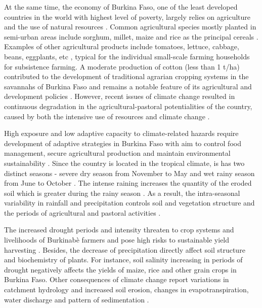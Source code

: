 \documentclass[knowledge,article,submit,pdftex,moreauthors]{Definitions/mdpi}
\begin{document}
At the same time, the economy of Burkina Faso, one of the least developed countries in the world with highest level of poverty, largely relies on agriculture and the use of natural resources \cite{1525946}. Common agricultural species mostly planted in semi-urban areas include sorghum, millet, maize and rice as the principal cereals \cite{SEOGO2023106475,ARUMUGAM2023126655}. Examples of other agricultural products include tomatoes, lettuce, cabbage, beans, eggplants, etc \cite{Ouedraogo2019}, typical for the individual small-scale farming households for subsistence farming. A moderate production of cotton (less than 1 t/ha) contributed to the development of traditional agrarian cropping systems in the savannahs of Burkina Faso and remains a notable feature of its agricultural and development policies \cite{Soumare}. However, recent issues of climate change resulted in continuous degradation in the agricultural-pastoral potentialities of the country, caused by both the intensive use of resources \cite{Vall} and climate change \cite{DIMOBE2022126299}. 

High exposure and low adaptive capacity to climate-related hazards require development of adaptive strategies in Burkina Faso with aim to control food management, secure agricultural production and maintain environmental sustainability \cite{BUNCLARK2018243,daniel2013farming}. Since the country is located in the tropical climate, is has two distinct seasons - severe dry season from November to May and wet rainy season from June to October \cite{OFORISARPONG1987179}. The intense raining increases the quantity of the eroded soil which is greater during the rainy season \cite{Sanou}. As a result, the intra-seasonal variability in rainfall and precipitation controls soil and vegetation structure and the periods of agricultural and pastoral activities \cite{brons2000climate}. 

The increased drought periods and intensity threaten to crop systems and livelihoods of Burkinabè farmers and pose high risks to sustainable yield harvesting \cite{su142315637,salter1967crop,atmos13071155}. Besides, the decrease of precipitation directly affect soil structure and biochemistry of plants. For instance, soil salinity increasing in periods of drought negatively affects the yields of maize, rice and other grain crops in Burkina Faso. Other consequences of climate change report variations in catchment hydrology and increased soil erosion, changes in evapotranspiration, water discharge and pattern of sedimentation \cite{OPDEHIPT2019431,OPDEHIPT201863}.
\end{document}
